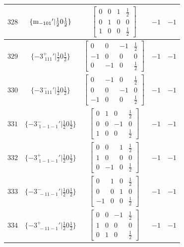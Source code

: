 \documentclass[fleqn,8pt]{jsarticle}
\begin{document}
\begin{longtable}{ccccc}
$ 328 $ & $ \{{\rm m}_{-101}{}'|\frac{1}{2} 0 \frac{1}{2}\} $ & $ \begin{bmatrix} 0 & 0 & 1 & \frac{1}{2} \\ 0 & 1 & 0 & 0 \\ 1 & 0 & 0 & \frac{1}{2} \end{bmatrix} $ & $ -1 $ & $ -1 $ \\ \hline
$ 329 $ & $ \{-3^{+}_{\,\,111}{}'|\frac{1}{2} 0 \frac{1}{2}\} $ & $ \begin{bmatrix} 0 & 0 & -1 & \frac{1}{2} \\ -1 & 0 & 0 & 0 \\ 0 & -1 & 0 & \frac{1}{2} \end{bmatrix} $ & $ -1 $ & $ -1 $ \\ \hline
$ 330 $ & $ \{-3^{-}_{\,\,111}{}'|\frac{1}{2} 0 \frac{1}{2}\} $ & $ \begin{bmatrix} 0 & -1 & 0 & \frac{1}{2} \\ 0 & 0 & -1 & 0 \\ -1 & 0 & 0 & \frac{1}{2} \end{bmatrix} $ & $ -1 $ & $ -1 $ \\ \hline
$ 331 $ & $ \{-3^{-}_{\,\,1-1-1}{}'|\frac{1}{2} 0 \frac{1}{2}\} $ & $ \begin{bmatrix} 0 & 1 & 0 & \frac{1}{2} \\ 0 & 0 & -1 & 0 \\ 1 & 0 & 0 & \frac{1}{2} \end{bmatrix} $ & $ -1 $ & $ -1 $ \\ \hline
$ 332 $ & $ \{-3^{+}_{\,\,1-1-1}{}'|\frac{1}{2} 0 \frac{1}{2}\} $ & $ \begin{bmatrix} 0 & 0 & 1 & \frac{1}{2} \\ 1 & 0 & 0 & 0 \\ 0 & -1 & 0 & \frac{1}{2} \end{bmatrix} $ & $ -1 $ & $ -1 $ \\ \hline
$ 333 $ & $ \{-3^{-}_{\,\,-11-1}{}'|\frac{1}{2} 0 \frac{1}{2}\} $ & $ \begin{bmatrix} 0 & 1 & 0 & \frac{1}{2} \\ 0 & 0 & 1 & 0 \\ -1 & 0 & 0 & \frac{1}{2} \end{bmatrix} $ & $ -1 $ & $ -1 $ \\ \hline
$ 334 $ & $ \{-3^{+}_{\,\,-11-1}{}'|\frac{1}{2} 0 \frac{1}{2}\} $ & $ \begin{bmatrix} 0 & 0 & -1 & \frac{1}{2} \\ 1 & 0 & 0 & 0 \\ 0 & 1 & 0 & \frac{1}{2} \end{bmatrix} $ & $ -1 $ & $ -1 $ \\ \hline

\end{longtable}
\end{document}

